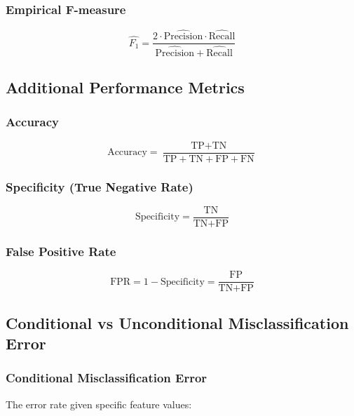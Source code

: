 \documentclass[12pt,a4paper]{article}
\begin{document}
\subsubsection{Empirical F-measure}

\begin{equation}
\widehat{F_1} = \frac{2 \cdot \widehat{\text{Precision}} \cdot \widehat{\text{Recall}}}{\widehat{\text{Precision}} + \widehat{\text{Recall}}}
\end{equation}

\subsection{Additional Performance Metrics}

\subsubsection{Accuracy}
\begin{equation}
\text{Accuracy} = \frac{\text{TP} + \text{TN}}{\text{TP} + \text{TN} + \text{FP} + \text{FN}}
\end{equation}

\subsubsection{Specificity (True Negative Rate)}
\begin{equation}
\text{Specificity} = \frac{\text{TN}}{\text{TN} + \text{FP}}
\end{equation}

\subsubsection{False Positive Rate}
\begin{equation}
\text{FPR} = 1 - \text{Specificity} = \frac{\text{FP}}{\text{TN} + \text{FP}}
\end{equation}

\subsection{Conditional vs Unconditional Misclassification Error}

\subsubsection{Conditional Misclassification Error}

The error rate given specific feature values:
\end{document}
